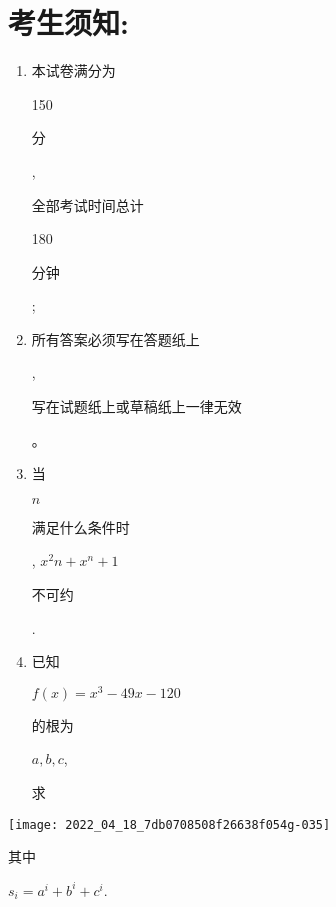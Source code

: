 \documentclass[10pt]{article}
\begin{document}
\section{考生须知:}
\begin{enumerate}
  \item \begin{CJK}{UTF8}{mj}本试卷满分为\end{CJK} 150 \begin{CJK}{UTF8}{mj}分\end{CJK}, \begin{CJK}{UTF8}{mj}全部考试时间总计\end{CJK} 180 \begin{CJK}{UTF8}{mj}分钟\end{CJK};

  \item \begin{CJK}{UTF8}{mj}所有答案必须写在答题纸上\end{CJK}, \begin{CJK}{UTF8}{mj}写在试题纸上或草稿纸上一律无效\end{CJK}。

  \item \begin{CJK}{UTF8}{mj}当\end{CJK} $n$ \begin{CJK}{UTF8}{mj}满足什么条件时\end{CJK}, $x^{2} n+x^{n}+1$ \begin{CJK}{UTF8}{mj}不可约\end{CJK}.

  \item \begin{CJK}{UTF8}{mj}已知\end{CJK} $f(x)=x^{3}-49 x-120$ \begin{CJK}{UTF8}{mj}的根为\end{CJK} $a, b, c$, \begin{CJK}{UTF8}{mj}求\end{CJK}

\end{enumerate}
\texttt{[image: 2022\_04\_18\_7db0708508f26638f054g-035]}

\begin{CJK}{UTF8}{mj}其中\end{CJK} $s_{i}=a^{i}+b^{i}+c^{i}$.
\end{document}
